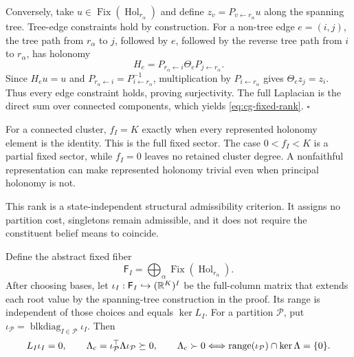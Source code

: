 Conversely, take
\(u\in\operatorname{Fix}(\operatorname{Hol}_{r_\alpha})\) and define
\(z_v=P_{v\leftarrow r_\alpha}u\) along the spanning tree. Tree-edge
constraints hold by construction. For a non-tree edge \(e=(i,j)\), the tree
path from \(r_\alpha\) to \(j\), followed by \(e\), followed by the reverse
tree path from \(i\) to \(r_\alpha\), has holonomy
\begin{equation}
H_e=P_{r_\alpha\leftarrow i}\Theta_e
P_{j\leftarrow r_\alpha}.
\label{eq:cg-fundamental-cycle-holonomy}
\end{equation}
Since \(H_eu=u\) and
\(P_{r_\alpha\leftarrow i}=P_{i\leftarrow r_\alpha}^{-1}\), multiplication
by \(P_{i\leftarrow r_\alpha}\) gives
\(\Theta_ez_j=z_i\). Thus every edge constraint holds, proving surjectivity.
The full Laplacian is the direct sum over connected components, which yields
\eqref{eq:cg-fixed-rank}. \(\square\)

For a connected cluster, \(f_I=K\) exactly when every represented holonomy
element is the identity. This is the full fixed sector. The case
\(0<f_I<K\) is a partial fixed sector, while \(f_I=0\) leaves no retained
cluster degree. A nonfaithful representation can make represented holonomy
trivial even when principal holonomy is not. 

This rank is a state-independent structural admissibility criterion. It assigns no
partition cost, singletons remain admissible, and it does not require the
constituent belief means to coincide. 

Define the abstract fixed fiber
\begin{equation}
\mathsf F_I
=\bigoplus_\alpha\operatorname{Fix}
(\operatorname{Hol}_{r_\alpha}).
\label{eq:cg-abstract-fixed-fiber}
\end{equation}
After choosing bases, let
\(\iota_I:\mathsf F_I\hookrightarrow(\mathbb R^K)^I\) be the full-column matrix
that extends each root value by the spanning-tree construction in the proof.
Its range is independent of those choices and equals \(\ker L_I\). For a
partition \(\mathcal P\), put
\(\iota_{\mathcal P}=\operatorname{blkdiag}_{I\in\mathcal P}\iota_I\).
Then
\begin{equation}
L_I\iota_I=0,\qquad
\Lambda_{\rm c}=\iota_{\mathcal P}^\top\Lambda
\iota_{\mathcal P}\succeq0,\qquad
\Lambda_{\rm c}\succ0
\Longleftrightarrow
\operatorname{range}(\iota_{\mathcal P})\cap\ker\Lambda=\{0\}.
\label{eq:cg-partial-properness}
\end{equation}

